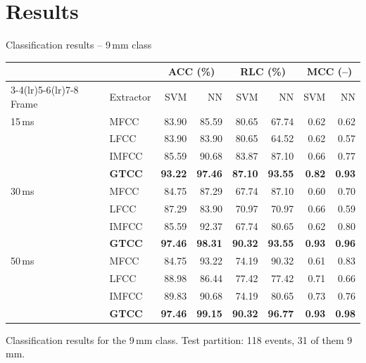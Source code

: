 \documentclass[aspectratio=169,10pt]{beamer}
\newcommand{\gtcc}[1]{\textbf{\color{accent}#1}}
\begin{document}
\section{Results}

\begin{frame}{Classification results -- 9\,mm class}
  \centering
  \footnotesize
  \vspace{-2mm}
  \renewcommand{\arraystretch}{0.95}
  \begin{tabular}{ll rr rr rr}
    \toprule
    & & \multicolumn{2}{c}{ACC (\%)} & \multicolumn{2}{c}{RLC (\%)} & \multicolumn{2}{c}{MCC (--)}\\
    \cmidrule(lr){3-4}\cmidrule(lr){5-6}\cmidrule(lr){7-8}
    Frame & Extractor & SVM & NN & SVM & NN & SVM & NN\\
    \midrule
    15\,ms & MFCC  & 83.90 & 85.59 & 80.65 & 67.74 & 0.62 & 0.62\\
           & LFCC  & 83.90 & 83.90 & 80.65 & 64.52 & 0.62 & 0.57\\
           & IMFCC & 85.59 & 90.68 & 83.87 & 87.10 & 0.66 & 0.77\\
           & \gtcc{GTCC} & \gtcc{93.22} & \gtcc{97.46} & \gtcc{87.10} & \gtcc{93.55} & \gtcc{0.82} & \gtcc{0.93}\\
    \midrule
    30\,ms & MFCC  & 84.75 & 87.29 & 67.74 & 87.10 & 0.60 & 0.70\\
           & LFCC  & 87.29 & 83.90 & 70.97 & 70.97 & 0.66 & 0.59\\
           & IMFCC & 85.59 & 92.37 & 67.74 & 80.65 & 0.62 & 0.80\\
           & \gtcc{GTCC} & \gtcc{97.46} & \gtcc{98.31} & \gtcc{90.32} & \gtcc{93.55} & \gtcc{0.93} & \gtcc{0.96}\\
    \midrule
    50\,ms & MFCC  & 84.75 & 93.22 & 74.19 & 90.32 & 0.61 & 0.83\\
           & LFCC  & 88.98 & 86.44 & 77.42 & 77.42 & 0.71 & 0.66\\
           & IMFCC & 89.83 & 90.68 & 74.19 & 80.65 & 0.73 & 0.76\\
           & \gtcc{GTCC} & \gtcc{97.46} & \gtcc{99.15} & \gtcc{90.32} & \gtcc{96.77} & \gtcc{0.93} & \gtcc{0.98}\\
    \bottomrule
  \end{tabular}
  \par\vspace{1mm}
  {\scriptsize\color{ink!70} Classification results for the 9\,mm class.
   Test partition: 118 events, 31 of them 9\,mm.}
\end{frame}
\end{document}
